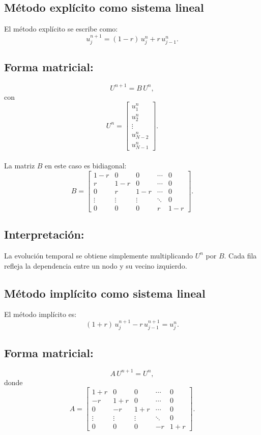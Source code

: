 \documentclass[12pt,a4paper]{article}
\begin{document}
\subsection{Método explícito como sistema lineal}

El método explícito se escribe como:
\[
u_j^{n+1} = (1-r)\,u_j^n + r\,u_{j-1}^n.
\]

\subsection*{Forma matricial:}
\[
U^{n+1} = B\,U^n,
\]
con
\[
U^n = 
\begin{bmatrix}
u_1^n \\[4pt] u_2^n \\[4pt] \vdots \\[4pt] u_{N-2}^n \\[4pt] u_{N-1}^n
\end{bmatrix}.
\] \\

La matriz $B$ en este caso es bidiagonal:
\[
B = 
\begin{bmatrix}
1-r & 0   & 0   & \cdots & 0 \\[4pt]
r   & 1-r & 0   & \cdots & 0 \\[4pt]
0   & r   & 1-r & \cdots & 0 \\[4pt]
\vdots & \vdots & \vdots & \ddots & 0 \\[4pt]
0   & 0   & 0   & r      & 1-r
\end{bmatrix}.
\]

\subsection*{Interpretación:}
La evolución temporal se obtiene simplemente multiplicando $U^n$ por $B$. Cada fila refleja la dependencia entre un nodo y su vecino izquierdo.

\subsection{Método implícito como sistema lineal}

El método implícito es:
\[
(1+r)\,u_j^{n+1} - r\,u_{j-1}^{n+1} = u_j^n.
\]

\subsection*{Forma matricial:}
\[
A\,U^{n+1} = U^n,
\]
donde
\[
A = 
\begin{bmatrix}
1+r & 0   & 0   & \cdots & 0 \\[4pt]
-r  & 1+r & 0   & \cdots & 0 \\[4pt]
0   & -r  & 1+r & \cdots & 0 \\[4pt]
\vdots & \vdots & \vdots & \ddots & 0 \\[4pt]
0   & 0   & 0   & -r     & 1+r
\end{bmatrix}.
\]
\end{document}
